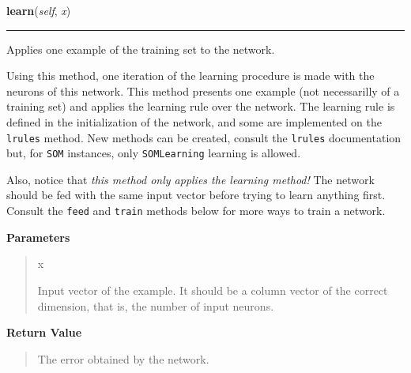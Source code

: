     \vspace{0.5ex}

    \begin{boxedminipage}{\textwidth}

    \raggedright \textbf{learn}(\textit{self}, \textit{x})

    \vspace{-1.5ex}

    \rule{\textwidth}{0.5\fboxrule}

Applies one example of the training set to the network.

Using this method, one iteration of the learning procedure is made with
the neurons of this network. This method presents one example (not
necessarilly of a training set) and applies the learning rule over the
network. The learning rule is defined in the initialization of the
network, and some are implemented on the \texttt{lrules} method. New methods
can be created, consult the \texttt{lrules} documentation but, for
\texttt{SOM} instances, only \texttt{SOMLearning} learning is allowed.

Also, notice that \emph{this method only applies the learning method!} The
network should be fed with the same input vector before trying to learn
anything first. Consult the \texttt{feed} and \texttt{train} methods below for
more ways to train a network.
    \vspace{1ex}

      \textbf{Parameters}
      \begin{quote}
        \begin{Ventry}{x}

          \item[x]


Input vector of the example. It should be a column vector of the
correct dimension, that is, the number of input neurons.
        \end{Ventry}

      \end{quote}

    \vspace{1ex}

      \textbf{Return Value}
      \begin{quote}

The error obtained by the network.
      \end{quote}

    \vspace{1ex}

    \end{boxedminipage}

